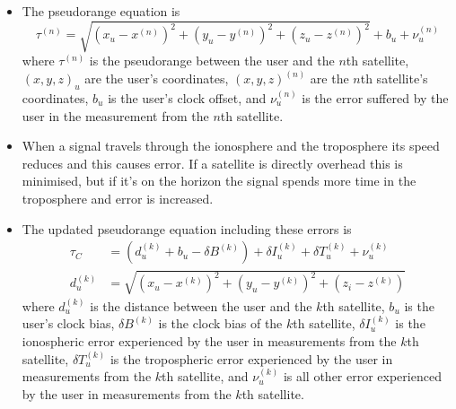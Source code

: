 \documentclass{article}
\begin{document}
\begin{itemize}
  \item The pseudorange equation is \[\tau^{(n)} = \sqrt{(x_u - x^{(n)})^2 + (y_u - y^{(n)})^2 + (z_u - z^{(n)})^2} + b_u + \nu_u^{(n)}\] where $\tau^{(n)}$ is the pseudorange between the user and the $n$th satellite, $(x,y,z)_u$ are the user's coordinates, $(x,y,z)^{(n)}$ are the $n$th satellite's coordinates, $b_u$ is the user's clock offset, and $\nu_u^{(n)}$ is the error suffered by the user in the measurement from the $n$th satellite.

  \item When a signal travels through the ionosphere and the troposphere its speed reduces and this causes error. If a satellite is directly overhead this is minimised, but if it's on the horizon the signal spends more time in the troposphere and error is increased.

  \item The updated pseudorange equation including these errors is \begin{align*}
          \tau_C    & = \left( d_u^{(k)} + b_u - \delta B^{(k)} \right) + \delta I_u^{(k)} + \delta T_u^{(k)} + \nu_u^{(k)} \\
          d_u^{(k)} & = \sqrt{(x_u - x^{(k)})^2 + (y_u - y^{(k)})^2 + (z_i - z^{(k)})}
        \end{align*} where $d_u^{(k)}$ is the distance between the user and the $k$th satellite, $b_u$ is the user's clock bias, $\delta B^{(k)}$ is the clock bias of the $k$th satellite, $\delta I_u^{(k)}$ is the ionospheric error experienced by the user in measurements from the $k$th satellite, $\delta T_u^{(k)}$ is the tropospheric error experienced by the user in measurements from the $k$th satellite, and $\nu_u^{(k)}$ is all other error experienced by the user in measurements from the $k$th satellite.
\end{itemize}
\end{document}
